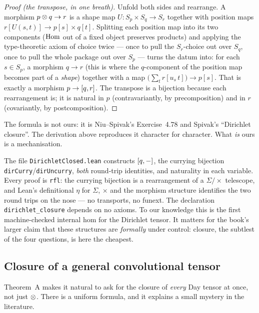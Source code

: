 \begin{proof}[Proof (the transpose, in one breath)]
Unfold both sides and rearrange. A morphism $p\mathbin{\otimes} q\to r$ is a shape map
$U\colon S_p\times S_q\to S_r$ together with position maps
$r[U(s,t)]\to p[s]\times q[t]$. Splitting each position map into its two
components ($\operatorname{Hom}$ out of a fixed object preserves products) and applying the
type-theoretic axiom of choice twice --- once to pull the $S_r$-choice out over
$S_q$, once to pull the whole package out over $S_p$ --- turns the datum into: for
each $s\in S_p$, a morphism $q\to r$ (this is where the $q$-component of the
position map becomes part of a \emph{shape}) together with a map
$\bigl(\sum_{t} r[u_s\,t]\bigr)\to p[s]$. That is exactly a morphism
$p\to[q,r]$. The transpose is a bijection because each rearrangement is; it is
natural in $p$ (contravariantly, by precomposition) and in $r$ (covariantly, by
postcomposition).
\end{proof}

The formula is not ours: it is Niu--Spivak's Exercise~4.78 and Spivak's
``Dirichlet closure''. The derivation above reproduces it character for
character. What \emph{is} ours is a mechanisation.

\begin{Remark}\label{rem:leanclosed}
The file \texttt{DirichletClosed.lean} constructs $[q,-]$, the currying
bijection \texttt{dirCurry}/\texttt{dirUncurry}, \emph{both} round-trip
identities, and naturality in each variable. Every proof is \texttt{rfl}: the
currying bijection is a rearrangement of a $\Sigma/\times$ telescope, and Lean's
definitional $\eta$ for $\Sigma$, $\times$ and the morphism structure identifies
the two round trips on the nose --- no transports, no funext. The declaration
\texttt{dirichlet\_closure} depends on no axioms. To our knowledge this is the
first machine-checked internal hom for the Dirichlet tensor. It matters for the
book's larger claim that these structures are \emph{formally} under control:
closure, the subtlest of the four questions, is here the cheapest.
\end{Remark}

\subsection{Closure of a general convolutional tensor}

Theorem~A makes it natural to ask for the closure of \emph{every} Day tensor at
once, not just $\mathbin{\otimes}$. There is a uniform formula, and it explains a small
mystery in the literature.

